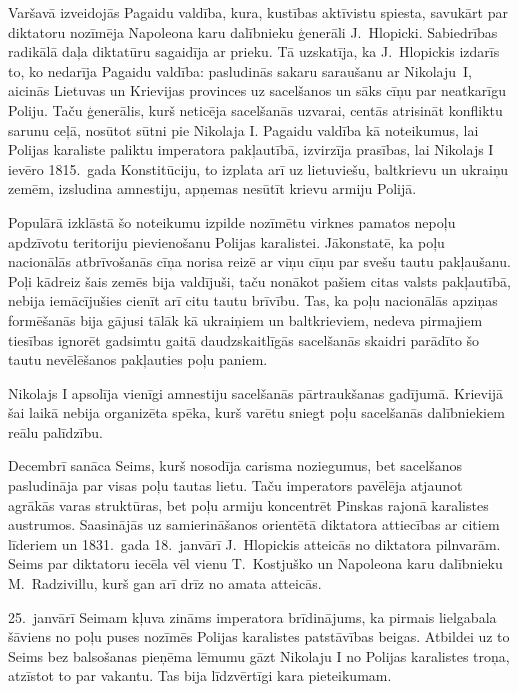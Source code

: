 \documentclass[twoside,a5paper,12pt,fleqn,openany]{extbook}
\begin{document}
Varšavā izveidojās Pagaidu valdība, kura, kustības aktīvistu spiesta, savukārt par diktatoru nozīmēja Napoleona karu dalībnieku ģenerāli J.~Hlopicki. Sabiedrības radikālā daļa diktatūru sagaidīja ar prieku. Tā uzskatīja, ka J.~Hlopickis izdarīs to, ko nedarīja Pagaidu valdība: pasludinās sakaru saraušanu ar Nikolaju~I, aicinās Lietuvas un Krievijas provinces uz sacelšanos un sāks cīņu par neatkarīgu Poliju. Taču ģenerālis, kurš neticēja sacelšanās uzvarai, centās atrisināt konfliktu sarunu ceļā, nosūtot sūtni pie Nikolaja I. Pagaidu valdība kā noteikumus, lai Polijas karaliste paliktu imperatora pakļautībā, izvirzīja prasības, lai Nikolajs I ievēro 1815.~gada Konstitūciju, to izplata arī uz lietuviešu, baltkrievu un ukraiņu zemēm, izsludina amnestiju, apņemas nesūtīt krievu armiju Polijā.

Populārā izklāstā šo noteikumu izpilde nozīmētu virknes pamatos nepoļu apdzīvotu teritoriju pievienošanu Polijas karalistei. Jākonstatē, ka poļu nacionālās atbrīvošanās cīņa norisa reizē ar viņu cīņu par svešu tautu pakļaušanu. Poļi kādreiz šais zemēs bija valdījuši, taču nonākot pašiem citas valsts pakļautībā, nebija iemācījušies cienīt arī citu tautu brīvību. Tas, ka poļu nacionālās apziņas formēšanās bija gājusi tālāk kā ukraiņiem un baltkrieviem, nedeva pirmajiem tiesības ignorēt gadsimtu gaitā daudzskaitlīgās sacelšanās skaidri parādīto šo tautu nevēlēšanos pakļauties poļu paniem.

Nikolajs I apsolīja vienīgi amnestiju sacelšanās pārtraukšanas gadījumā. Krievijā šai laikā nebija organizēta spēka, kurš varētu sniegt poļu sacelšanās dalībniekiem reālu palīdzību.

Decembrī sanāca Seims, kurš nosodīja carisma noziegumus, bet sacelšanos pasludināja par visas poļu tautas lietu. Taču imperators pavēlēja atjaunot agrākās varas struktūras, bet poļu armiju koncentrēt Pinskas rajonā karalistes austrumos. Saasinājās uz samierināšanos orientētā diktatora attiecības ar citiem līderiem un 1831.~gada 18.~janvārī J.~Hlopickis atteicās no diktatora pilnvarām. Seims par diktatoru iecēla vēl vienu T.~Kostjuško un Napoleona karu dalībnieku M.~Radzivillu, kurš gan arī drīz no amata atteicās.

25.~janvārī Seimam kļuva zināms imperatora brīdinājums, ka pirmais lielgabala šāviens no poļu puses nozīmēs Polijas karalistes patstāvības beigas. Atbildei uz to Seims bez balsošanas pieņēma lēmumu gāzt Nikolaju I no Polijas karalistes troņa, atzīstot to par vakantu. Tas bija līdzvērtīgi kara pieteikumam.
\end{document}
